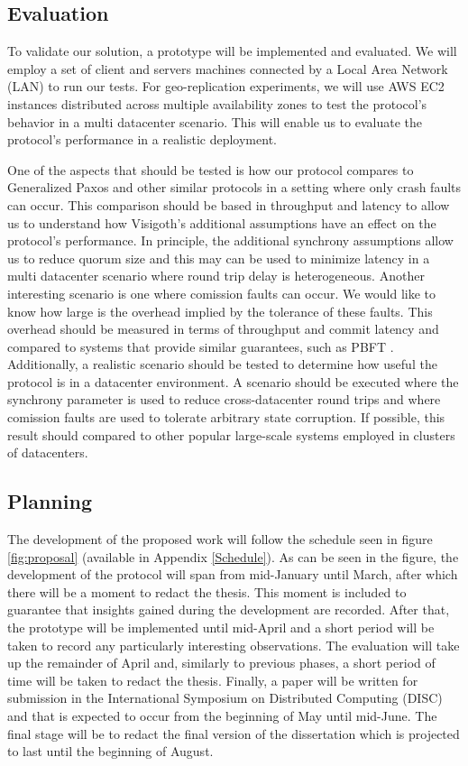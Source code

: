 \documentclass[runningheads,a4paper]{llncs}
\begin{document}
\subsection{Evaluation}  \label{Evaluation}
To validate our solution, a prototype will be implemented and evaluated. We will employ a set of client and servers machines connected by a Local Area Network (LAN) to run our tests. For geo-replication experiments, we will use AWS EC2 instances distributed across multiple availability zones to test the protocol's behavior in a multi datacenter scenario. This will enable us to evaluate the protocol's performance in a realistic deployment. \par
One of the aspects that should be tested is how our protocol compares to Generalized Paxos and other similar protocols in a setting where only crash faults can occur. This comparison should be based in throughput and latency to allow us to understand how Visigoth's additional assumptions have an effect on the protocol's performance. In principle, the additional synchrony assumptions allow us to reduce quorum size and this may can be used to minimize latency in a multi datacenter scenario where round trip delay is heterogeneous. Another interesting scenario is one where comission faults can occur. We would like to know how large is the overhead implied by the tolerance of these faults. This overhead should be measured in terms of throughput and commit latency and compared to systems that provide similar guarantees, such as PBFT \cite{Castro1999}. Additionally, a realistic scenario should be tested to determine how useful the protocol is in a datacenter environment. A scenario should be executed where the synchrony parameter is used to reduce cross-datacenter round trips and where comission faults are used to tolerate arbitrary state corruption. If possible, this result should compared to other popular large-scale systems employed in clusters of datacenters.

\subsection{Planning} \label{Planning}
The development of the proposed work will follow the schedule seen in figure \ref{fig:proposal} (available in Appendix \ref{Schedule}). As can be seen in the figure, the development of the protocol will span from mid-January until March, after which there will be a moment to redact the thesis. This moment is included to guarantee that insights gained during the development are recorded. After that, the prototype will be implemented until mid-April and a short period will be taken to record any particularly interesting observations. The evaluation will take up the remainder of April and, similarly to previous phases, a short period of time will be taken to redact the thesis. Finally, a paper will be written for submission in the International Symposium on Distributed Computing (DISC) and that is expected to occur from the beginning of May until mid-June. The final stage will be to redact the final version of the dissertation which is projected to last until the beginning of August.
\end{document}
